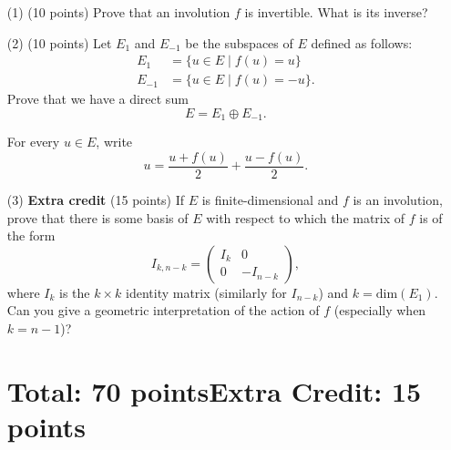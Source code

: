 \documentclass[12pt]{article}
\begin{document}
\begin{itemize}
\item[(1)](10 points)
Prove that an  involution $f$ is invertible. What is its inverse?

\item[(2)](10 points)
Let $E_1$ and $E_{-1}$ be the subspaces of $E$ defined as follows:
\begin{align*}
E_1 & = \{u \in E \mid f(u) = u\} \\
E_{-1} & = \{u \in E \mid f(u) = -u\}.
\end{align*}
Prove that we have a direct sum
\[
E = E_{1} \oplus E_{-1}.
\]

\hint
For every $u\in E$, write
\[
u = \frac{u + f(u)}{2} + \frac{u - f(u)}{2}. 
\]

\item[(3)]{ \bf Extra credit }(15 points)
If $E$ is finite-dimensional and $f$ is an involution, prove that
there is some basis of $E$ with respect to which the matrix of $f$ is of the form
\[
I_{k , n - k} =
\begin{pmatrix}
I_k & 0 \\
0 & - I_{n - k}
\end{pmatrix},
\]
where $I_k$ is the $k\times k$ identity matrix 
(similarly for $I_{n -  k}$) and $k = \mathrm{dim}(E_1)$.
Can you give a geometric interpretation of the action of $f$
(especially when   $k = n - 1$)?

\section*{Total: 70 points\qquad Extra Credit: 15 points}
\end{itemize}
\end{document}
